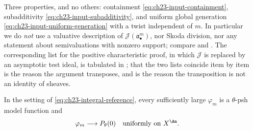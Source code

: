 \begin{remark}
\label{rem:ch23-what-is-imported}
Three properties, and no others: containment
\eqref{eq:ch23-input-containment}, subadditivity
\eqref{eq:ch23-input-subadditivity}, and uniform global generation
\eqref{eq:ch23-input-uniform-generation} with a twist independent of $m$.
In particular we do \emph{not} use a valuative description of
$\mathcal J(\mathfrak a_\bullet^m)$, nor Skoda division, nor any statement
about semivaluations with nonzero support; compare
 and
.  The corresponding list for the positive
characteristic proof, in which $\mathcal J$ is replaced by an asymptotic
test ideal, is tabulated in ; that the two
lists coincide item by item is the reason the argument transposes, and
 is the reason the transposition is
not an identity of sheaves.
\end{remark}

\begin{theorem}\label{thm:ch23-base-ideal-approximation}
In the setting of \eqref{eq:ch23-integral-reference}, every sufficiently
large
$\varphi_m$ is a $\theta$-psh model function and
\begin{equation}\label{eq:ch23-base-ideal-convergence}
                         \varphi_m\longrightarrow P_\theta(0)
                         \quad\text{uniformly on }X^{\An}.
\end{equation}
\end{theorem}


